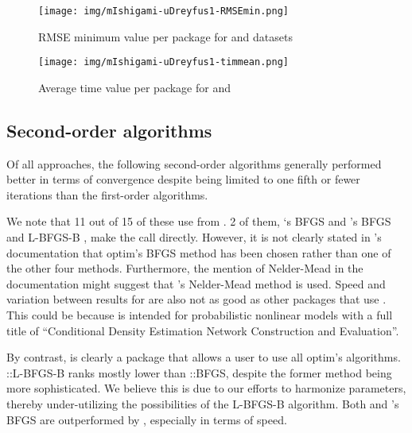 \begin{figure}
  \centering
  \texttt{[image: img/mIshigami-uDreyfus1-RMSEmin.png]}
        \label{fig:Allpkg:RMSEmin}
        \caption{RMSE minimum value per package for 
        and  datasets}
\end{figure}

\begin{figure}
  \centering
  \texttt{[image: img/mIshigami-uDreyfus1-timmean.png]}
        \label{fig:Allpkg:timemean}
        \caption{Average time value per package for 
        and }
\end{figure}

\hypertarget{second-order-algorithms}{%
\subsection{Second-order algorithms}\label{second-order-algorithms}}

Of all approaches, the following second-order algorithms generally
performed better in terms of convergence despite being limited to one
fifth or fewer iterations than the first-order algorithms.

We note that 11 out of 15 of these  use
 from . 2 of them, `s BFGS
\citep{R-CaDENCE} and 's BFGS and L-BFGS-B
\citep{R-validann}, make the call directly. However, it is not clearly
stated in 's documentation that optim's BFGS method has
been chosen rather than one of the other four methods. Furthermore, the
mention of Nelder-Mead in the documentation might suggest that
's Nelder-Mead method is used. Speed and variation between
results for  are also not as good as other packages
that use . This could be because  is
intended for probabilistic nonlinear models with a full title of
``Conditional Density Estimation Network Construction and Evaluation''.

By contrast,  is clearly a package that allows a user
to use all optim's algorithms. ::L-BFGS-B ranks mostly
lower than ::BFGS, despite the former method being
more sophisticated. We believe this is due to our efforts to harmonize
parameters, thereby under-utilizing the possibilities of the L-BFGS-B
algorithm. Both  and 's BFGS are
outperformed by , especially in terms of speed.

